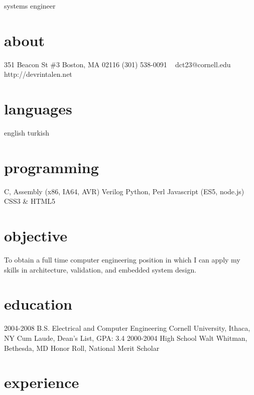 \documentclass[]{friggeri-cv}
\begin{document}
       {systems engineer}


\begin{aside}
  \section{about}
    351 Beacon St \#3
    Boston, MA 02116
    (301) 538-0091
    ~
    dct23@cornell.edu
    http://devrintalen.net
  \section{languages}
    english
    turkish
  \section{programming}
    C, Assembly
    (x86, IA64, AVR)
    Verilog
    Python, Perl
    Javascript
    (ES5, node.js)
    CSS3 \& HTML5
\end{aside}

\section{objective}


To obtain a full time computer engineering position in which I can apply my skills in architecture, validation, and embedded system design.

\section{education}

\begin{entrylist}
  \entry
    {2004-2008}
    {B.S. {\normalfont Electrical and Computer Engineering}}
    {Cornell University, Ithaca, NY}
    {Cum Laude, Dean's List, GPA: 3.4}
  \entry
    {2000-2004}
    {High School}
    {Walt Whitman, Bethesda, MD}
    {Honor Roll, National Merit Scholar}
\end{entrylist}

\section{experience}
\end{document}
